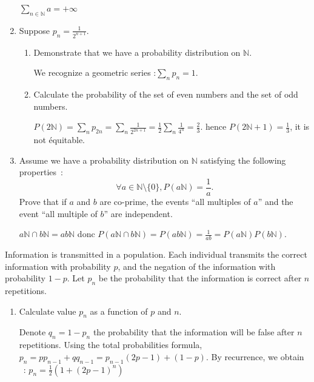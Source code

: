 \documentclass[a4paper,11pt]{exam}
\newcommand{\N}{\mathbb{N}}
\begin{document}
\begin{questions}
\begin{enumerate}
\begin{solution}
		$\sum_{n\in \N} a = +\infty$
	\end{solution}
	
	\item   Suppose  $p_n = \frac{1}{2^{n+1}} .$
	\begin{enumerate}
		\item  Demonstrate that we have a probability distribution on $\N$.
		\begin{solution}
			We recognize a geometric series :$\sum_n p_n =1$.
		\end{solution}
		\item Calculate the probability of the set of even numbers and the set of odd numbers. 
		
		\begin{solution}
			$ P(2\N) = \sum_n p_{2n} = \sum_n \frac{1}{2^{2n+1}} = \frac{1}{2}  \sum_n \frac{1}{4^{n}} = \frac{2}{3}$.
			hence $P(2\N +1) = \frac{1}{3}$, it is not équitable.
		\end{solution}
	\end{enumerate}
	\item Assume we have a probability distribution on $\N$
	satisfying the following properties~:
	\[\forall a\in \N\setminus\{0\}, P(a\N) = \frac{1}{a} .\]
	Prove that if $ a $ and $ b $ are co-prime, the events ``all multiples of $ a $'' and the event ``all multiple of $ b $'' are independent.
	
	\begin{solution}
		$a\N \cap b\N = ab \N$ donc $P(a\N \cap b\N) = P(ab \N) = \frac{1}{ab} = P(a\N)P(b\N)$.
	\end{solution}
\end{enumerate}



\question
Information is transmitted in a population.
Each individual transmits the correct information with probability $ p $, and the negation of the information with probability $ 1-p $.
Let $ p_n $ be the probability that the information is correct after $ n $ repetitions.

\begin{enumerate}
	\item Calculate value $p_n$ as a function of $p$ and $n$.
	
	\begin{solution}
		Denote $q_n=1-p_n$ the probability that the information will be false after
		$n$ repetitions.
		Using the total probabilities formula,
		$p_n=pp_{n-1}+qq_{n-1} = p_{n-1}(2p-1)+(1-p)$.
		By recurrence, we obtain ~:
		$p_n = \frac{1}{2}( 1+ (2p-1)^n)$
	\end{solution}
	

\end{enumerate}
\end{questions}
\end{document}
